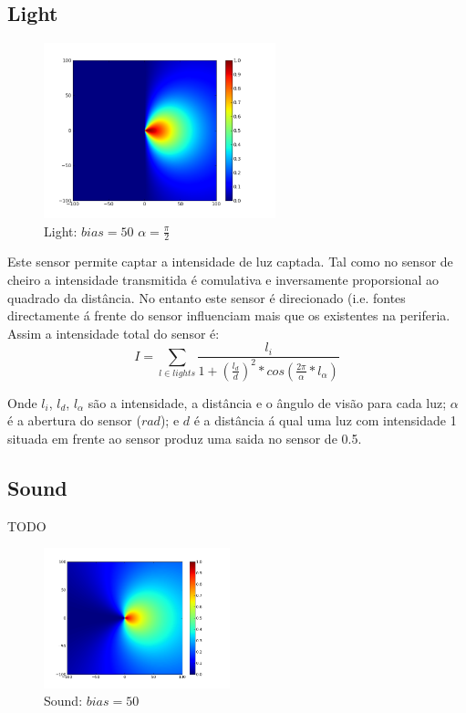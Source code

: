 \documentclass[a4paper]{article}
\begin{document}
\subsection{Light}
\begin{figure}[hb]
	\vspace{-20pt}
	\begin{center}
		\includegraphics[width=0.6\textwidth]{graphs/sensors/light.png}
	\end{center}
	\vspace{-20pt}
	\caption{Light: $bias=50$ $\alpha=\frac{\pi}{2}$}
\end{figure}

\indent Este sensor permite captar a intensidade de luz captada. Tal como no sensor de cheiro a intensidade transmitida
é comulativa e inversamente proporsional ao quadrado da distância. No entanto este sensor é direcionado (i.e. fontes
directamente á frente do sensor influenciam mais que os existentes na periferia. Assim a intensidade total do sensor é:
\[
	I = \displaystyle\sum\limits_{l \in lights} \frac{l_{i}}{1 + (\frac{l_{d}}{d})^{2}*cos(\frac{2\pi}{\alpha}*l_{\alpha})}
\]

Onde $l_{i}$, $l_{d}$, $l_{\alpha}$ são a intensidade, a distância e o ângulo de visão para cada luz;
$\alpha$ é a abertura do sensor ($rad$);
e $d$ é a distância á qual uma luz com intensidade 1 situada em frente ao sensor produz uma saida no sensor de 0.5.

\subsection{Sound}
TODO
\begin{figure}
	\vspace{-30pt}
	\begin{center}
		\includegraphics[width=0.48\textwidth]{graphs/sensors/cardioid.png}
	\end{center}
	\vspace{-30pt}
	\caption{Sound: $bias=50$}
\end{figure}
\end{document}
